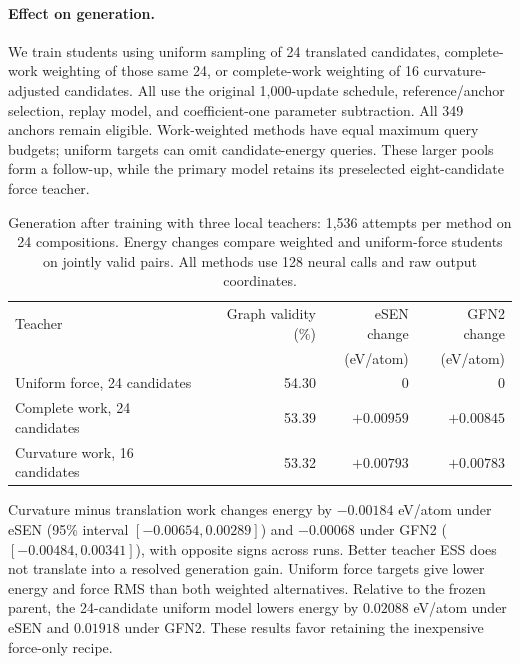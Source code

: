 \paragraph{Effect on generation.}
We train students using uniform sampling of 24 translated candidates, complete-work weighting of those same 24, or complete-work weighting of 16 curvature-adjusted candidates. All use the original 1,000-update schedule, reference/anchor selection, replay model, and coefficient-one parameter subtraction. All 349 anchors remain eligible. Work-weighted methods have equal maximum query budgets; uniform targets can omit candidate-energy queries. These larger pools form a follow-up, while the primary model retains its preselected eight-candidate force teacher.

\begin{table}[htbp]
\centering
\caption{Generation after training with three local teachers: 1,536 attempts per method on 24 compositions. Energy changes compare weighted and uniform-force students on jointly valid pairs. All methods use 128 neural calls and raw output coordinates.}
\small
\begin{tabular}{lrrr}
\toprule
Teacher & Graph validity (\%) & eSEN change & GFN2 change\\
 & & (eV/atom) & (eV/atom)\\
\midrule
Uniform force, 24 candidates &54.30&0&0\\
Complete work, 24 candidates &53.39&$+0.00959$&$+0.00845$\\
Curvature work, 16 candidates &53.32&$+0.00793$&$+0.00783$\\
\bottomrule
\end{tabular}
\end{table}

Curvature minus translation work changes energy by $-0.00184$ eV/atom under eSEN (95\% interval $[-0.00654,0.00289]$) and $-0.00068$ under GFN2 ($[-0.00484,0.00341]$), with opposite signs across runs. Better teacher ESS does not translate into a resolved generation gain. Uniform force targets give lower energy and force RMS than both weighted alternatives. Relative to the frozen parent, the 24-candidate uniform model lowers energy by $0.02088$ eV/atom under eSEN and $0.01918$ under GFN2. These results favor retaining the inexpensive force-only recipe.
